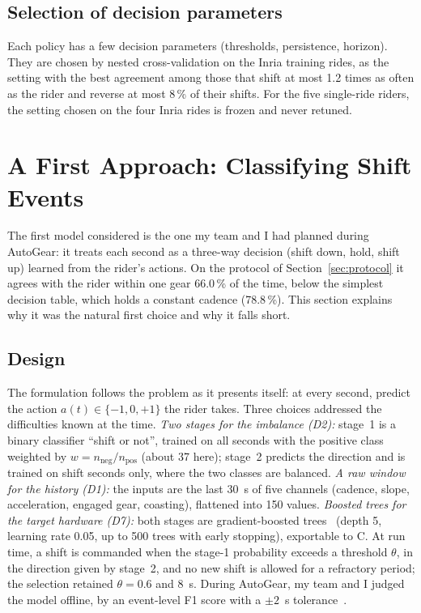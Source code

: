 \documentclass[conference]{IEEEtran}
\newcommand{\pct}{\,\%}
\begin{document}
\subsection{Selection of decision parameters}
Each policy has a few decision parameters (thresholds, persistence, horizon). They are chosen by nested cross-validation on the Inria training rides, as the setting with the best agreement among those that shift at most 1.2 times as often as the rider and reverse at most 8\pct{} of their shifts. For the five single-ride riders, the setting chosen on the four Inria rides is frozen and never retuned.

\section{A First Approach: Classifying Shift Events}\label{sec:event}
The first model considered is the one my team and I had planned during AutoGear: it treats each second as a three-way decision (shift down, hold, shift up) learned from the rider's actions. On the protocol of Section~\ref{sec:protocol} it agrees with the rider within one gear 66.0\pct{} of the time, below the simplest decision table, which holds a constant cadence (78.8\pct{}). This section explains why it was the natural first choice and why it falls short.

\subsection{Design}
The formulation follows the problem as it presents itself: at every second, predict the action $a(t) \in \{-1, 0, +1\}$ the rider takes. Three choices addressed the difficulties known at the time.
\emph{Two stages for the imbalance (D2):} stage~1 is a binary classifier ``shift or not'', trained on all seconds with the positive class weighted by $w = n_{\mathrm{neg}}/n_{\mathrm{pos}}$ (about 37 here); stage~2 predicts the direction and is trained on shift seconds only, where the two classes are balanced.
\emph{A raw window for the history (D1):} the inputs are the last 30~s of five channels (cadence, slope, acceleration, engaged gear, coasting), flattened into 150 values.
\emph{Boosted trees for the target hardware (D7):} both stages are gradient-boosted trees~\cite{xgboost} (depth 5, learning rate 0.05, up to 500 trees with early stopping), exportable to C.
At run time, a shift is commanded when the stage-1 probability exceeds a threshold $\theta$, in the direction given by stage~2, and no new shift is allowed for a refractory period; the selection retained $\theta = 0.6$ and 8~s. During AutoGear, my team and I judged the model offline, by an event-level F1 score with a $\pm 2$~s tolerance~\cite{mesaros}.
\end{document}
